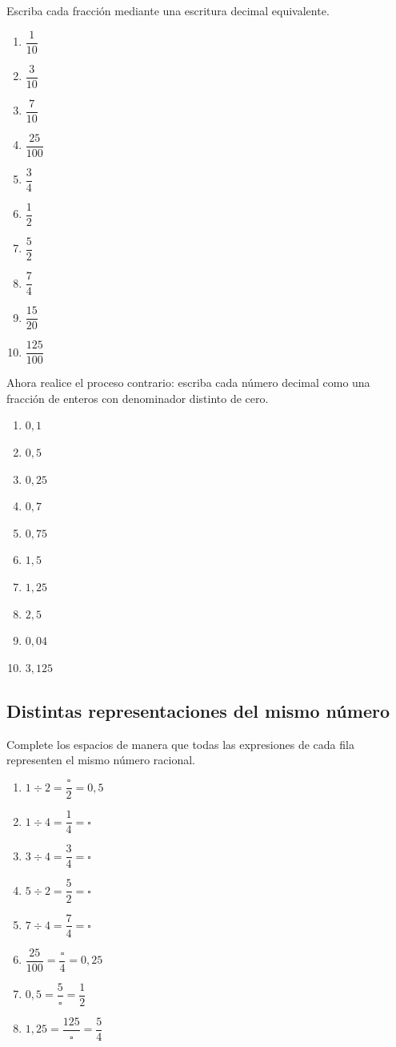 Escriba cada fracción mediante una escritura decimal equivalente.

\begin{enumerate}
\item \(\dfrac{1}{10}\)
\item \(\dfrac{3}{10}\)
\item \(\dfrac{7}{10}\)
\item \(\dfrac{25}{100}\)
\item \(\dfrac{3}{4}\)
\item \(\dfrac12\)
\item \(\dfrac{5}{2}\)
\item \(\dfrac{7}{4}\)
\item \(\dfrac{15}{20}\)
\item \(\dfrac{125}{100}\)
\end{enumerate}

Ahora realice el proceso contrario: escriba cada número decimal como una fracción de enteros con denominador distinto de cero.

\begin{enumerate}
\item \(0{,}1\)
\item \(0{,}5\)
\item \(0{,}25\)
\item \(0{,}7\)
\item \(0{,}75\)
\item \(1{,}5\)
\item \(1{,}25\)
\item \(2{,}5\)
\item \(0{,}04\)
\item \(3{,}125\)
\end{enumerate}

\subsection*{Distintas representaciones del mismo número}

Complete los espacios de manera que todas las expresiones de cada fila representen el mismo número racional.

\begin{enumerate}
\item \(1\div2=\dfrac{\square}{2}=0{,}5\)
\item \(1\div4=\dfrac14=\square\)
\item \(3\div4=\dfrac34=\square\)
\item \(5\div2=\dfrac52=\square\)
\item \(7\div4=\dfrac74=\square\)
\item \(\dfrac{25}{100}=\dfrac{\square}{4}=0{,}25\)
\item \(0{,}5=\dfrac{5}{\square}=\dfrac12\)
\item \(1{,}25=\dfrac{125}{\square}=\dfrac54\)
\end{enumerate}

